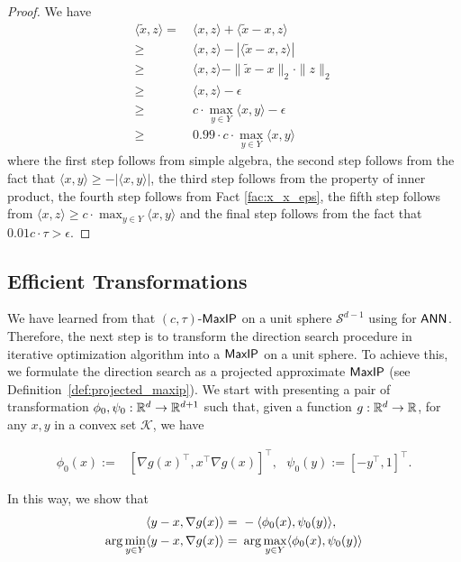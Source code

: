 \begin{proof}
We have
\begin{align*}
\langle \widetilde{x}, z \rangle 
= & ~ \langle x , z \rangle + \langle \widetilde{x}-x, z\rangle \\
\geq & ~ \langle x , z \rangle - | \langle \widetilde{x}-x, z\rangle | \\
\geq & ~  \langle x , z \rangle -  \| \widetilde{x} - x \|_2 \cdot \| z \|_2 \\
\geq & ~  \langle x , z \rangle -\epsilon \\
\geq & ~ c \cdot \max_{y \in Y} \langle x, y \rangle - \epsilon \\
\geq & ~ 0.99 \cdot c \cdot \max_{y \in Y} \langle x, y \rangle
\end{align*}
where the first step follows from simple algebra, the second step follows from the fact that $\langle x,y\rangle \geq -| \langle x , y \rangle |$, the third step follows from the property of inner product, the fourth step follows from Fact \ref{fac:x_x_eps}, the fifth step follows from $\langle x, z \rangle \geq c \cdot \max_{y \in Y} \langle x , y \rangle$ and the final step follows from the fact that $0.01 c \cdot \tau > \epsilon$.

\end{proof}

\subsection{Efficient Transformations}\label{sec:transform_intro}

We have learned from %
that $(c,\tau)$-{$\mathsf{MaxIP}$} on a unit sphere $\mathcal{S}^{d-1}$ using {\lsh} for {$\mathsf{ANN}$}. Therefore, the next step is to transform the direction search procedure in iterative optimization algorithm into a $\mathsf{MaxIP}$ on a unit sphere. To achieve this, we formulate the direction search as a projected approximate $\mathsf{MaxIP}$ (see Definition~\ref{def:projected_maxip}). We start with presenting a pair of transformation $\phi_0,\psi_0:\mathbb{R}^{d} \rightarrow \mathbb{R}^{d+1}$ such that, given a function $g : \mathbb{R}^d \rightarrow \mathbb{R}$, for any $x,y$ in a convex set $\mathcal{K}$, we have
 
\begin{align}\label{eq:asym_trans_direct}
\phi_0 (x) := &  [\nabla g(x) ^\top, x^\top\nabla g(x)]^\top, ~~~
\psi_0(y) := [ -y^\top,1]^\top.
\end{align}

In this way, we show that
\begin{align}\label{eq:asym_trans_direct_res}
    \langle y-x,\nabla g(x) \rangle =&~-\langle  \phi_0(x) , \psi_0(y) \rangle,\notag\\
    \arg\min_{y\in Y} \langle y-x,\nabla g(x) \rangle=&~\arg\max_{y\in Y} \langle  \phi_0(x) , \psi_0(y) \rangle
\end{align}

